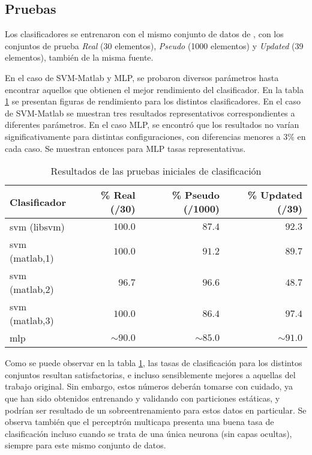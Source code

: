 \documentclass[12pt,bibliography=oldstyle,DIV=12,parskip=half-,titlepage]{scrartcl}
\begin{document}
\subsection{Pruebas}
Los clasificadores se entrenaron con el mismo conjunto de datos
de \cite{xue}, con los conjuntos de prueba \emph{Real} (30 elementos),
\emph{Pseudo} (1000 elementos) y \emph{Updated} (39 elementos), también
de la misma fuente.

En el caso de SVM-Matlab y MLP, se probaron diversos parámetros hasta
encontrar aquellos que obtienen el mejor rendimiento del clasificador.
En la tabla \ref{testresults} se presentan figuras de rendimiento para
los distintos clasificadores. En el caso de SVM-Matlab se muestran
tres resultados representativos correspondientes a diferentes
parámetros.  En el caso MLP, se encontró que los resultados no varían
significativamente para distintas configuraciones, con diferencias
menores a 3\% en cada caso.  Se muestran entonces para MLP tasas
representativas.
%
\begin{table}
  \caption{Resultados de las pruebas iniciales de clasificación}
  \center%
  \begin{tabular}{lrrr}
    Clasificador   & \% Real (/30) &
                     \% Pseudo (/1000) & \% Updated (/39) \\\hline
    svm (libsvm)   & $100.0$    & $87.4$     & $92.3$     \\
    svm (matlab,1) & $100.0$    & $91.2$     & $89.7$     \\
    svm (matlab,2) & $96.7$     & $96.6$     & $48.7$     \\
    svm (matlab,3) & $100.0$    & $86.4$     & $97.4$     \\
    mlp            & $\sim90.0$ & $\sim85.0$ & $\sim91.0$  
  \end{tabular}
  \label{testresults}
\end{table}
%

Como se puede observar en la tabla \ref{testresults}, las tasas de
clasificación para los distintos conjuntos resultan satisfactorias, e
incluso sensiblemente mejores a aquellas del trabajo original.  Sin
embargo, estos números deberán tomarse con cuidado, ya que han sido
obtenidos entrenando y validando con particiones estáticas, y podrían
ser resultado de un sobreentrenamiento para estos datos en
particular. Se observa también que el perceptrón multicapa presenta
una buena tasa de clasificación incluso cuando se trata de una única
neurona (sin capas ocultas), siempre para este mismo conjunto de
datos.
\end{document}
